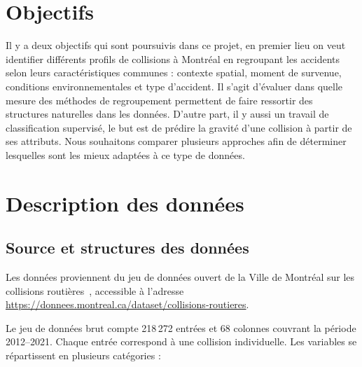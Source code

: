 \documentclass[11pt]{article}
\begin{document}
 
 
\section{Objectifs}
 
Il y a deux objectifs qui sont poursuivis dans ce projet, en premier lieu on veut identifier différents profils de collisions à Montréal en regroupant les
accidents selon leurs caractéristiques communes : contexte spatial, moment de survenue, conditions environnementales et type d'accident.
Il s'agit d'évaluer dans quelle mesure des méthodes de regroupement permettent de faire ressortir des structures naturelles dans les données. D'autre part, il y aussi un travail de classification supervisé, le but est de prédire la gravité d'une collision à partir de ses attributs.
Nous souhaitons comparer plusieurs approches afin de déterminer lesquelles
sont les mieux adaptées à ce type de données.
 
 
 
\section{Description des données}
 
\subsection{Source et structures des données}
 
Les données proviennent du jeu de données ouvert de la Ville de Montréal sur les collisions routières~\cite{donnees_mtl}, accessible à
l'adresse \url{https://donnees.montreal.ca/dataset/collisions-routieres}. 
 
Le jeu de données brut compte 218\,272 entrées et 68 colonnes couvrant la période 2012--2021.
Chaque entrée correspond à une collision individuelle. Les variables se répartissent en plusieurs catégories :
 
\end{document}
